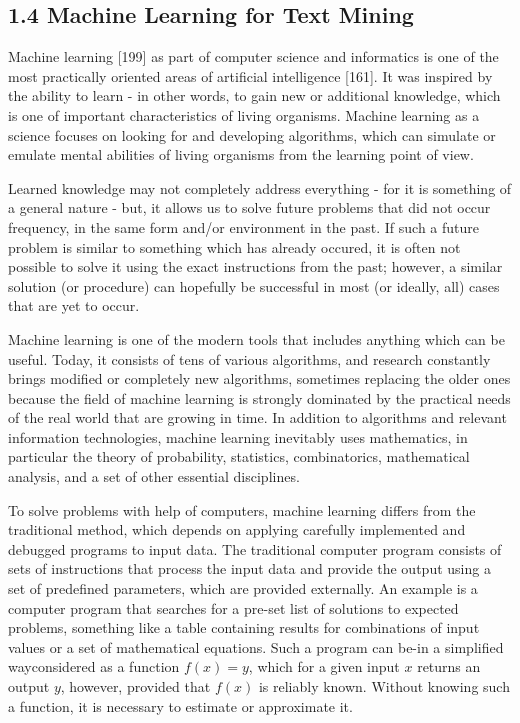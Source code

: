 \documentclass[10pt]{book}
\begin{document}
\subsection*{1.4 Machine Learning for Text Mining}
Machine learning [199] as part of computer science and informatics is one of the most practically oriented areas of artificial intelligence [161]. It was inspired by the ability to learn - in other words, to gain new or additional knowledge, which\\
is one of important characteristics of living organisms. Machine learning as a science focuses on looking for and developing algorithms, which can simulate or emulate mental abilities of living organisms from the learning point of view.

Learned knowledge may not completely address everything - for it is something of a general nature - but, it allows us to solve future problems that did not occur frequency, in the same form and/or environment in the past. If such a future problem is similar to something which has already occured, it is often not possible to solve it using the exact instructions from the past; however, a similar solution (or procedure) can hopefully be successful in most (or ideally, all) cases that are yet to occur.

Machine learning is one of the modern tools that includes anything which can be useful. Today, it consists of tens of various algorithms, and research constantly brings modified or completely new algorithms, sometimes replacing the older ones because the field of machine learning is strongly dominated by the practical needs of the real world that are growing in time. In addition to algorithms and relevant information technologies, machine learning inevitably uses mathematics, in particular the theory of probability, statistics, combinatorics, mathematical analysis, and a set of other essential disciplines.

To solve problems with help of computers, machine learning differs from the traditional method, which depends on applying carefully implemented and debugged programs to input data. The traditional computer program consists of sets of instructions that process the input data and provide the output using a set of predefined parameters, which are provided externally. An example is a computer program that searches for a pre-set list of solutions to expected problems, something like a table containing results for combinations of input values or a set of mathematical equations. Such a program can be-in a simplified wayconsidered as a function $f(x)=y$, which for a given input $x$ returns an output $y$, however, provided that $f(x)$ is reliably known. Without knowing such a function, it is necessary to estimate or approximate it.
\end{document}

